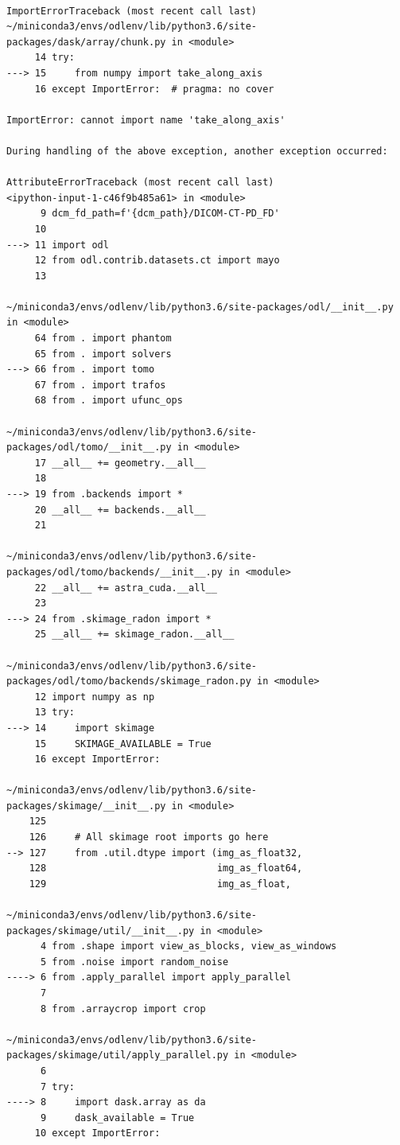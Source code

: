 \documentclass[a4paper, 11pt]{article}
\begin{document}
\begin{verbatim}

ImportErrorTraceback (most recent call last)
~/miniconda3/envs/odlenv/lib/python3.6/site-packages/dask/array/chunk.py in <module>
     14 try:
---> 15     from numpy import take_along_axis
     16 except ImportError:  # pragma: no cover

ImportError: cannot import name 'take_along_axis'

During handling of the above exception, another exception occurred:

AttributeErrorTraceback (most recent call last)
<ipython-input-1-c46f9b485a61> in <module>
      9 dcm_fd_path=f'{dcm_path}/DICOM-CT-PD_FD'
     10 
---> 11 import odl
     12 from odl.contrib.datasets.ct import mayo
     13 

~/miniconda3/envs/odlenv/lib/python3.6/site-packages/odl/__init__.py in <module>
     64 from . import phantom
     65 from . import solvers
---> 66 from . import tomo
     67 from . import trafos
     68 from . import ufunc_ops

~/miniconda3/envs/odlenv/lib/python3.6/site-packages/odl/tomo/__init__.py in <module>
     17 __all__ += geometry.__all__
     18 
---> 19 from .backends import *
     20 __all__ += backends.__all__
     21 

~/miniconda3/envs/odlenv/lib/python3.6/site-packages/odl/tomo/backends/__init__.py in <module>
     22 __all__ += astra_cuda.__all__
     23 
---> 24 from .skimage_radon import *
     25 __all__ += skimage_radon.__all__

~/miniconda3/envs/odlenv/lib/python3.6/site-packages/odl/tomo/backends/skimage_radon.py in <module>
     12 import numpy as np
     13 try:
---> 14     import skimage
     15     SKIMAGE_AVAILABLE = True
     16 except ImportError:

~/miniconda3/envs/odlenv/lib/python3.6/site-packages/skimage/__init__.py in <module>
    125 
    126     # All skimage root imports go here
--> 127     from .util.dtype import (img_as_float32,
    128                              img_as_float64,
    129                              img_as_float,

~/miniconda3/envs/odlenv/lib/python3.6/site-packages/skimage/util/__init__.py in <module>
      4 from .shape import view_as_blocks, view_as_windows
      5 from .noise import random_noise
----> 6 from .apply_parallel import apply_parallel
      7 
      8 from .arraycrop import crop

~/miniconda3/envs/odlenv/lib/python3.6/site-packages/skimage/util/apply_parallel.py in <module>
      6 
      7 try:
----> 8     import dask.array as da
      9     dask_available = True
     10 except ImportError:


\end{verbatim}
\end{document}
